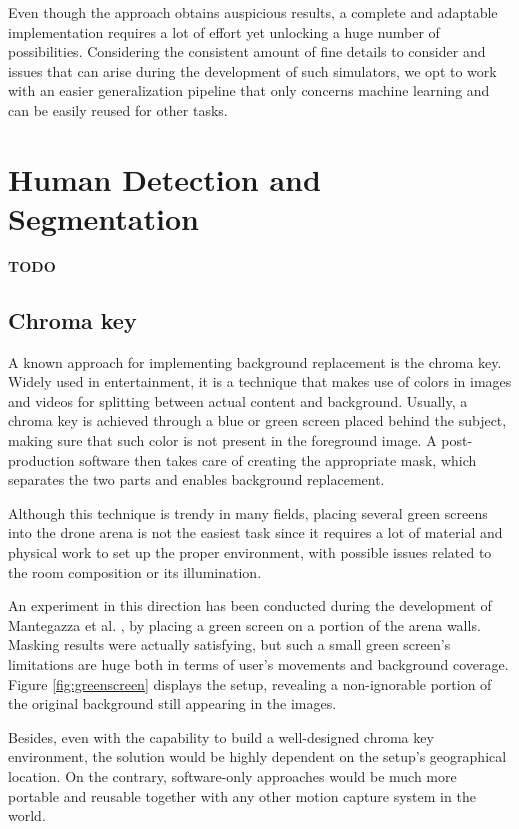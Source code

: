 Even though the approach obtains auspicious results, a complete and adaptable implementation requires a lot of effort yet unlocking a huge number of possibilities. Considering the consistent amount of fine details to consider and issues that can arise during the development of such simulators, we opt to work with an easier generalization pipeline that only concerns machine learning and can be easily reused for other tasks.




\section{Human Detection and Segmentation}
\label{sec:sota-humandetseg}

\textbf{TODO}



\subsection{Chroma key}

A known approach for implementing background replacement is the chroma key. Widely used in entertainment, it is a technique that makes use of colors in images and videos for splitting between actual content and background. Usually, a chroma key is achieved through a blue or green screen placed behind the subject, making sure that such color is not present in the foreground image. A post-production software then takes care of creating the appropriate mask, which separates the two parts and enables background replacement.

Although this technique is trendy in many fields, placing several green screens into the drone arena is not the easiest task since it requires a lot of material and physical work to set up the proper environment, with possible issues related to the room composition or its illumination.

An experiment in this direction has been conducted during the development of Mantegazza et al. \cite{mantegazza2019visionbased}, by placing a green screen on a portion of the arena walls. Masking results were actually satisfying, but such a small green screen's limitations are huge both in terms of user's movements and background coverage. Figure \ref{fig:greenscreen} displays the setup, revealing a non-ignorable portion of the original background still appearing in the images.

Besides, even with the capability to build a well-designed chroma key environment, the solution would be highly dependent on the setup's geographical location. On the contrary, software-only approaches would be much more portable and reusable together with any other motion capture system in the world.

